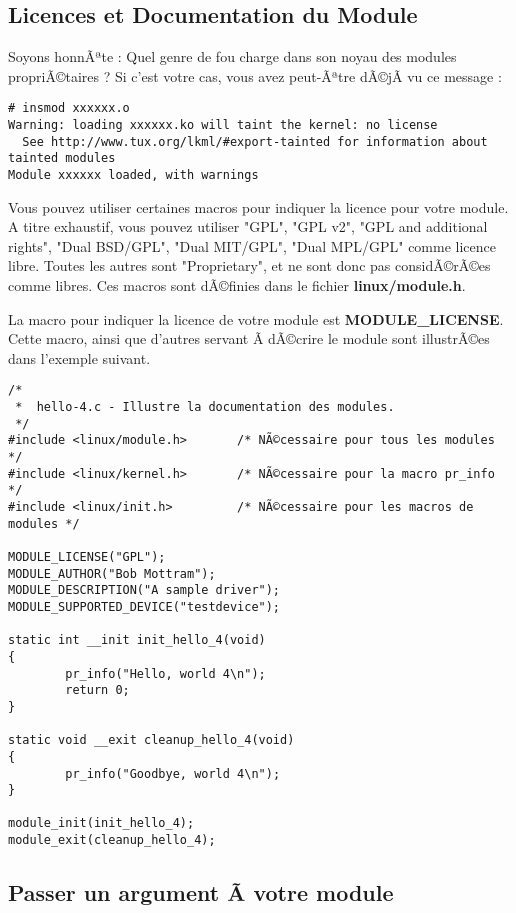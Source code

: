 \documentclass[11pt]{article}
\begin{document}
\subsection*{Licences et Documentation du Module}
\label{sec-4-4}

Soyons honnÃªte : Quel genre de fou charge dans son noyau des modules propriÃ©taires ? Si c'est votre cas, vous avez peut-Ãªtre dÃ©jÃ  vu ce message :

\begin{verbatim}
# insmod xxxxxx.o
Warning: loading xxxxxx.ko will taint the kernel: no license
  See http://www.tux.org/lkml/#export-tainted for information about tainted modules
Module xxxxxx loaded, with warnings
\end{verbatim}

Vous pouvez utiliser certaines macros pour indiquer la licence pour votre module. A titre exhaustif, vous pouvez utiliser "GPL", "GPL v2", "GPL and additional rights", "Dual BSD/GPL", "Dual MIT/GPL", "Dual MPL/GPL" comme licence libre. Toutes les autres sont "Proprietary", et ne sont donc pas considÃ©rÃ©es comme libres. Ces macros sont dÃ©finies dans le fichier \textbf{linux/module.h}.

La macro pour indiquer la licence de votre module est \textbf{MODULE\_LICENSE}. Cette macro, ainsi que d'autres servant Ã  dÃ©crire le module sont illustrÃ©es dans l'exemple suivant.

\begin{verbatim}
/*
 *  hello-4.c - Illustre la documentation des modules.
 */
#include <linux/module.h>       /* NÃ©cessaire pour tous les modules */
#include <linux/kernel.h>       /* NÃ©cessaire pour la macro pr_info */
#include <linux/init.h>         /* NÃ©cessaire pour les macros de modules */

MODULE_LICENSE("GPL");
MODULE_AUTHOR("Bob Mottram");
MODULE_DESCRIPTION("A sample driver");
MODULE_SUPPORTED_DEVICE("testdevice");

static int __init init_hello_4(void)
{
        pr_info("Hello, world 4\n");
        return 0;
}

static void __exit cleanup_hello_4(void)
{
        pr_info("Goodbye, world 4\n");
}

module_init(init_hello_4);
module_exit(cleanup_hello_4);
\end{verbatim}

\subsection*{Passer un argument Ã  votre module}
\label{sec-4-5}
\end{document}

